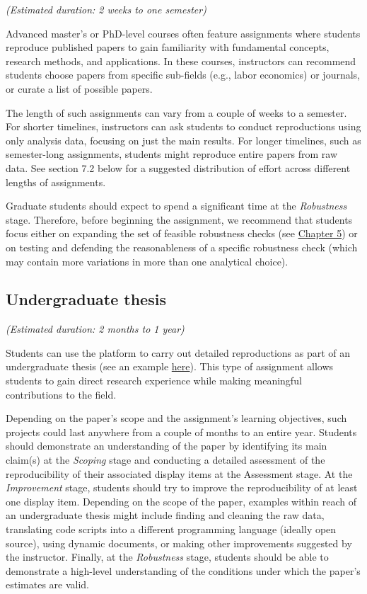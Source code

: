 \documentclass[
]{book}
\begin{document}
\emph{(Estimated duration: 2 weeks to one semester)}

Advanced master's or PhD-level courses often feature assignments where students reproduce published papers to gain familiarity with fundamental concepts, research methods, and applications. In these courses, instructors can recommend students choose papers from specific sub-fields (e.g., labor economics) or journals, or curate a list of possible papers.

The length of such assignments can vary from a couple of weeks to a semester. For shorter timelines, instructors can ask students to conduct reproductions using only analysis data, focusing on just the main results. For longer timelines, such as semester-long assignments, students might reproduce entire papers from raw data. See section 7.2 below for a suggested distribution of effort across different lengths of assignments.

Graduate students should expect to spend a significant time at the \emph{Robustness} stage. Therefore, before beginning the assignment, we recommend that students focus either on expanding the set of feasible robustness checks (see \href{https://bitss.github.io/ACRE/robust.html}{Chapter 5}) or on testing and defending the reasonableness of a specific robustness check (which may contain more variations in more than one analytical choice).

\hypertarget{undergraduate-thesis}{%
\subsection{Undergraduate thesis}\label{undergraduate-thesis}}

\emph{(Estimated duration: 2 months to 1 year)}

Students can use the platform to carry out detailed reproductions as part of an undergraduate thesis (see an example \href{https://osf.io/3e6ps/}{here}). This type of assignment allows students to gain direct research experience while making meaningful contributions to the field.

Depending on the paper's scope and the assignment's learning objectives, such projects could last anywhere from a couple of months to an entire year. Students should demonstrate an understanding of the paper by identifying its main claim(s) at the \emph{Scoping} stage and conducting a detailed assessment of the reproducibility of their associated display items at the Assessment stage. At the \emph{Improvement} stage, students should try to improve the reproducibility of at least one display item. Depending on the scope of the paper, examples within reach of an undergraduate thesis might include finding and cleaning the raw data, translating code scripts into a different programming language (ideally open source), using dynamic documents, or making other improvements suggested by the instructor. Finally, at the \emph{Robustness} stage, students should be able to demonstrate a high-level understanding of the conditions under which the paper's estimates are valid.
\end{document}
